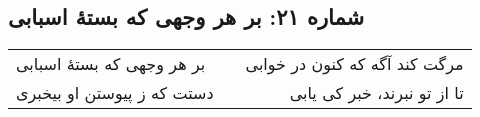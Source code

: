 \begin{center}
\section*{شماره ۲۱: بر هر وجهی که بستۀ اسبابی}
\label{sec:021}
\begin{longtable}{l p{0.5cm} r}
بر هر وجهی که بستهٔ اسبابی
&&
مرگت کند آگه که کنون در خوابی
\\
دستت که ز پیوستن او بیخبری
&&
تا از تو نبرند، خبر کی یابی
\\
\end{longtable}
\end{center}
